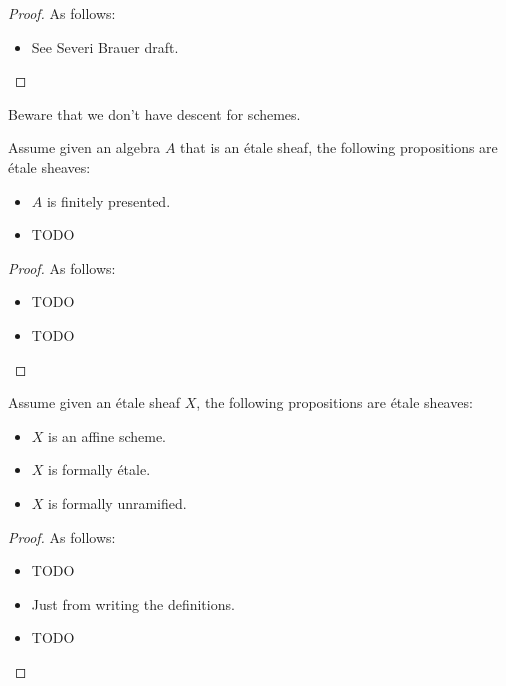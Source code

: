 \begin{proof}
As follows:
\begin{itemize}
\item[fp, cofp, ff] See Severi Brauer draft.
\end{itemize}
\end{proof}

\begin{remark}
Beware that we don't have descent for schemes.
\end{remark}

\begin{proposition}
Assume given an algebra $A$ that is an \'etale sheaf, the following propositions are \'etale sheaves:
\begin{itemize}[(i)]
\item $A$ is finitely presented.
\item TODO
\end{itemize}
\end{proposition}

\begin{proof}
As follows:
\begin{itemize}
\item[fp] TODO
\item TODO
\end{itemize}
\end{proof}

\begin{proposition}
Assume given an \'etale sheaf $X$, the following propositions are \'etale sheaves:
\begin{itemize}[(i)]
\item $X$ is an affine scheme.
\item $X$ is formally \'etale.
\item $X$ is formally unramified.
\end{itemize}
\end{proposition}

\begin{proof}
As follows:
\begin{itemize}
\item[affine] TODO
\item[\'et./unram.] Just from writing the definitions.
\item TODO
\end{itemize}
\end{proof}



